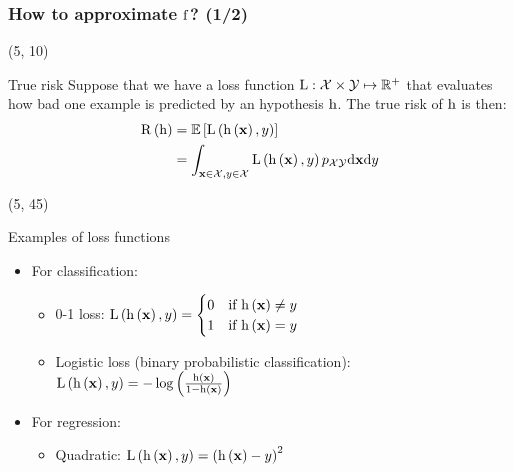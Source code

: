 \begin{frame}
  \frametitle{How to approximate $\mathrm{f}$? (1/2)}

  \begin{textblock}{90}(5, 10)
    \begin{block}{True risk}
      Suppose that we have a loss function $\mathrm{L}: \mathcal{X} \times \mathcal{Y} \mapsto
      \mathbb{R}^+$ that evaluates how bad one example is predicted by an hypothesis $\mathrm{h}$.
      The true risk of $\mathrm{h}$ is then:
      \begin{equation*}
        \begin{split}
          \mathrm{R} \left ( {\mathrm{h}} \right ) & = \mathrm{\mathbb{E}} \left [ {\mathrm{L} \left ( {\mathrm{h} \left ( {\mathbf{x}} \right ), y} \right )} \right ]\\
                              & = \int_{\mathbf{x} \in \mathcal{X}, y \in \mathcal{X}}
          \mathrm{L} \left ( {\mathrm{h} \left ( {\mathbf{x}} \right ), y} \right ) p_{\mathcal{X} \mathcal{Y}} \mathrm{d} \mathbf{x} \mathrm{d} y
        \end{split}
      \end{equation*}
    \end{block}
\end{textblock}

  \begin{textblock}{90}(5, 45)
    \begin{block}{Examples of loss functions}
      \begin{itemize}
      \item For classification:
        \begin{itemize}
        \item 0-1 loss:
          $\mathrm{L} \left ( {\mathrm{h} \left ( {\mathbf{x}} \right ), y} \right ) =
          \begin{cases}
            0 & \text{if $\mathrm{h} \left ( {\mathbf{x}} \right ) \ne y$} \\
            1 & \text{if $\mathrm{h} \left ( {\mathbf{x}} \right )  =  y$}
          \end{cases}
          $
        \item Logistic loss (binary probabilistic classification): $\mathrm{L} \left ( {\mathrm{h} \left ( {\mathbf{x}} \right ),
            y} \right ) = -\log \left ( {\frac{\mathrm{h} \left ( {\mathbf{x}} \right )}{1-\mathrm{h} \left ( {\mathbf{x}} \right )}} \right )$
        \end{itemize}
      \item For regression:
        \begin{itemize}
        \item Quadratic: $\mathrm{L} \left ( {\mathrm{h} \left ( {\mathbf{x}} \right ), y} \right )
          = \left( \mathrm{h} \left ( {\mathbf{x}} \right ) - y \right)^2$
        \end{itemize}
      \end{itemize}
    \end{block}
  \end{textblock}
\end{frame}


